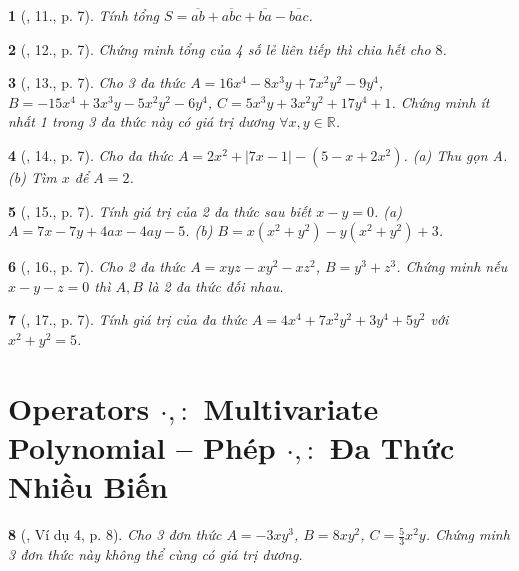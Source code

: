 \documentclass{article}
\newtheorem{baitoan}{}
\begin{document}
\begin{baitoan}[\cite{Tuyen_Toan_8}, 11., p. 7]
	Tính tổng $S = \overline{ab} + \overline{abc} + \overline{ba} -\overline{bac}$.
\end{baitoan}

\begin{baitoan}[\cite{Tuyen_Toan_8}, 12., p. 7]
	Chứng minh tổng của 4 số lẻ liên tiếp thì chia hết cho $8$.
\end{baitoan}

\begin{baitoan}[\cite{Tuyen_Toan_8}, 13., p. 7]
	Cho 3 đa thức $A = 16x^4 - 8x^3y + 7x^2y^2 - 9y^4$, $B = -15x^4 + 3x^3y - 5x^2y^2 - 6y^4$, $C = 5x^3y + 3x^2y^2 + 17y^4 + 1$. Chứng minh ít nhất 1 trong 3 đa thức này có giá trị dương $\forall x,y\in\mathbb{R}$.
\end{baitoan}

\begin{baitoan}[\cite{Tuyen_Toan_8}, 14., p. 7]
	Cho đa thức $A = 2x^2 + |7x - 1| - (5 - x + 2x^2)$. (a) Thu gọn A. (b) Tìm $x$ để $A = 2$.
\end{baitoan}

\begin{baitoan}[\cite{Tuyen_Toan_8}, 15., p. 7]
	Tính giá trị của 2 đa thức sau biết $x - y = 0$. (a) $A = 7x - 7y + 4ax - 4ay - 5$. (b) $B = x(x^2 + y^2) - y(x^2 + y^2) + 3$.
\end{baitoan}

\begin{baitoan}[\cite{Tuyen_Toan_8}, 16., p. 7]
	Cho 2 đa thức $A = xyz - xy^2 - xz^2$, $B = y^3 + z^3$. Chứng minh nếu $x - y - z = 0$ thì $A,B$ là 2 đa thức đối nhau.
\end{baitoan}

\begin{baitoan}[\cite{Tuyen_Toan_8}, 17., p. 7]
	Tính giá trị của đa thức $A = 4x^4 + 7x^2y^2 + 3y^4 + 5y^2$ với $x^2 + y^2 = 5$.
\end{baitoan}


\section{Operators $\cdot,:$ Multivariate Polynomial -- Phép $\cdot,:$ Đa Thức Nhiều Biến}

\begin{baitoan}[\cite{Tuyen_Toan_8}, Ví dụ 4, p. 8]
	Cho 3 đơn thức $A = -3xy^3$, $B = 8xy^2$, $C = \frac{5}{3}x^2y$. Chứng minh 3 đơn thức này không thể cùng có giá trị dương.
\end{baitoan}
\end{document}
